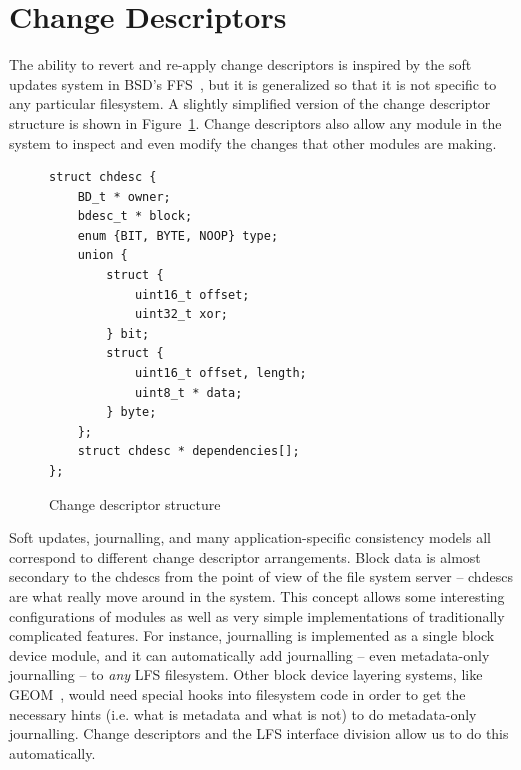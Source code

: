 \preparagraphspacing{}
\section*{Change Descriptors}
\label{sec:chdescs}


The ability to revert and re-apply change descriptors is inspired by the soft
updates system in BSD's FFS~\cite{ganger00soft}, but it is generalized so that
it is not specific to any particular filesystem. A slightly simplified version
of the change descriptor structure is shown in Figure~\ref{fig:chdesc}. Change
descriptors also allow any module in the system to inspect and even modify the
changes that other modules are making.

\begin{figure}
\begin{verbatim}
struct chdesc {
    BD_t * owner;
    bdesc_t * block;
    enum {BIT, BYTE, NOOP} type;
    union {
        struct {
            uint16_t offset;
            uint32_t xor;
        } bit;
        struct {
            uint16_t offset, length;
            uint8_t * data;
        } byte;
    };
    struct chdesc * dependencies[];
};
\end{verbatim}
\vspace{-12pt}
\caption{\label{fig:chdesc} Change descriptor structure}
\end{figure}


Soft updates, journalling, and many application-specific consistency models all
correspond to different change descriptor arrangements.
%
Block data is almost secondary to the chdescs from the point of view of the file
system server -- chdescs are what really move around in the system.
%
This concept allows some interesting configurations of
modules as well as very simple implementations of traditionally complicated
features. For instance, journalling is implemented as a single block device
module, and it can automatically add journalling -- even metadata-only
journalling -- to {\it any} LFS filesystem. Other block device layering systems,
like GEOM~\cite{geom}, would need special hooks into filesystem code in order to
get the necessary hints (i.e. what is metadata and what is not) to do
metadata-only journalling. Change descriptors and the LFS interface division
allow us to do this automatically.

